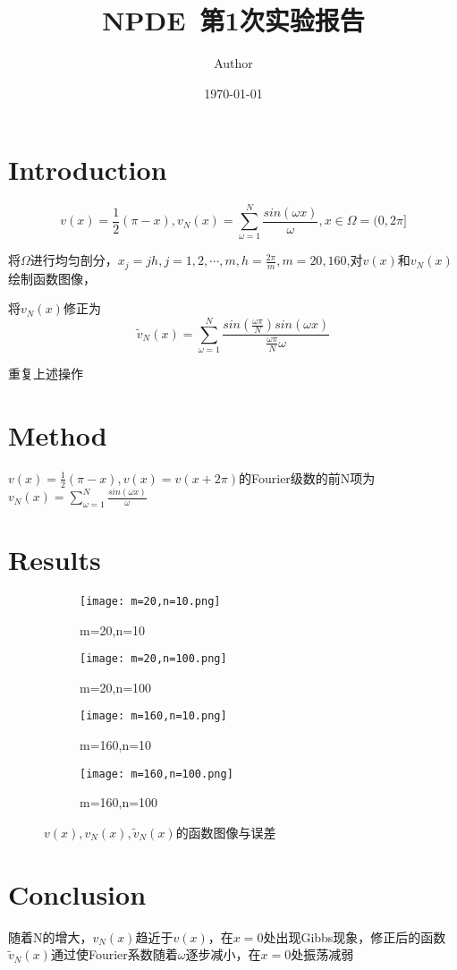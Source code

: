 \documentclass{article}
\title{NPDE~第1次实验报告}
\author{Author}
\date{\today}
\begin{document}
\maketitle

\section{Introduction}

$$v(x)=\frac{1}{2}(\pi-x),v_N(x)=\sum_{\omega =1}^{N}\frac{sin(\omega x)}{\omega},x \in \Omega=(0,2\pi]$$

将$\Omega$进行均匀剖分，$x_j=jh,j=1,2,\cdots,m,h=\frac{2\pi}{m},m=20,160$,对$v(x)$和$v_N(x)$绘制函数图像，

将$v_N(x)$修正为$$\widetilde{v}_N(x)=\sum_{\omega =1}^{N}\frac{sin(\frac{\omega \pi}{N})sin(\omega x)}{\frac{\omega \pi}{N}\omega} $$

重复上述操作

\section{Method}

$v(x)=\frac{1}{2}(\pi-x),v(x)=v(x+2\pi)$的Fourier级数的前N项为$v_N(x)=\sum_{\omega =1}^{N}\frac{sin(\omega x)}{\omega}$


\section{Results}

\begin{figure}[H]
    \centering
    \begin{subfigure}{0.35\textwidth}
        \texttt{[image: m=20,n=10.png]}
        \caption{m=20,n=10}        
    \end{subfigure}
    \begin{subfigure}{0.35\textwidth}
        \texttt{[image: m=20,n=100.png]}
        \caption{m=20,n=100}
    \end{subfigure}
    \begin{subfigure}{0.35\textwidth}
        \texttt{[image: m=160,n=10.png]}
        \caption{m=160,n=10}
    \end{subfigure}
    \begin{subfigure}{0.35\textwidth}
        \texttt{[image: m=160,n=100.png]}
        \caption{m=160,n=100}
    \end{subfigure}
    \caption{$v(x),v_N(x),\widetilde{v}_N(x)$的函数图像与误差}
\end{figure}



\section{Conclusion}

随着N的增大，$v_N(x)$趋近于$v(x)$，在$x=0$处出现Gibbs现象，修正后的函数$\widetilde{v}_N(x)$通过使Fourier系数随着$\omega$逐步减小，在$x=0$处振荡减弱
\end{document}
